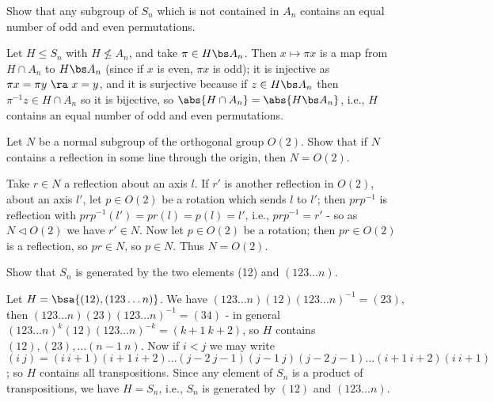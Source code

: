 \begin{problem} Show that any subgroup of $S_n$ which is not contained in $A_n$ contains an equal number of odd and even permutations.

\end{problem} 

\begin{solution}[\bf Solution.]Let $H\leq S_n$ with $H\nleq A_n$, and take $\pi \in H\bs A_n$. Then $x\mapsto \pi x$ is a map from $H\cap A_n$ to $H\bs A_n$ (since if $x$ is even, $\pi x$ is odd); it is injective as $\pi x = \pi y \ \ra \ x = y$, and it is surjective because if $z\in H\bs A_n$ then $\pi^{-1}z\in H\cap A_n$ so it is bijective, so $\abs{H\cap A_n} = \abs{H\bs A_n}$, i.e., $H$ contains an equal number of odd and even permutations.

\end{solution}

\begin{problem} Let $N$ be a normal subgroup of the orthogonal group $O(2)$. Show that if $N$ contains a reflection in some line through the origin, then $N = O(2)$.

\end{problem} 

\begin{solution}[\bf Solution.]Take $r\in N$ a reflection about an axis $l$. If $r'$ is another reflection in $O(2)$, about an axis $l'$, let $p\in O(2)$ be a rotation which sends $l$ to $l'$; then $prp^{-1}$ is reflection with $prp^{-1}(l') = pr(l) = p(l) = l'$, i.e., $prp^{-1} = r'$ - so as $N\lhd O(2)$ we have $r'\in N$. Now let $p \in O(2)$ be a rotation; then $pr\in O(2)$ is a reflection, so $pr\in N$, so $p\in N$. Thus $N = O(2)$.

\end{solution}

\begin{problem} Show that $S_n$ is generated by the two elements (12) and $(123 \dots n)$.

\end{problem} 

\begin{solution}[\bf Solution.]Let $H = \bsa{(12),(123\dots n)}$. We have $(123\dots n)(12)(123\dots n)^{-1} = (23)$, then $(123\dots n)(23)(123\dots n)^{-1} = (34)$ - in general $(123\dots n)^k(12)(123\dots n)^{-k} = (k+1\ k+2)$, so $H$ contains $(12),(23),\dots (n-1\ n)$. Now if $i<j$ we may write $(i\ j) = (i\ i+1)(i+1\ i+2)\dots (j-2\ j-1)(j-1\ j)(j-2\ j-1) \dots (i+1\ i+2)(i \ i+1)$; so $H$ contains all transpositions. Since any element of $S_n$ is a product of transpositions, we have $H=S_n$, i.e., $S_n$ is generated by $(12)$ and $(123\dots n)$.

\end{solution}

